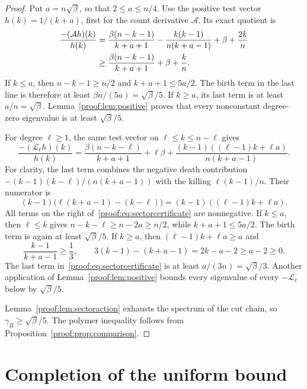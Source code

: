 \begin{proof}
Put $a=n\sqrt\beta$, so that $2\leq a\leq n/4$. Use the positive
test vector $h(k)=1/(k+a)$, first for the count derivative
$\mathcal A$. Its exact quotient is
\begin{align}
 \frac{-(\mathcal Ah)(k)}{h(k)}
 &=\frac{\beta(n-k-1)}{k+a+1}
   -\frac{k(k-1)}{n(k+a-1)}+\beta+\frac{2k}n\notag\\
 &\geq\frac{\beta(n-k-1)}{k+a+1}+\beta+\frac kn.
 \label{proof:eq:countreciprocal}
\end{align}
If $k\leq a$, then $n-k-1\geq n/2$ and
$k+a+1\leq5a/2$. The birth term in the last line is therefore at
least $\beta n/(5a)=\sqrt\beta/5$. If $k\geq a$, its last term is
at least $a/n=\sqrt\beta$. Lemma~\ref{proof:lem:positive} proves
that every nonconstant degree-zero eigenvalue is at least
$\sqrt\beta/5$.

For degree $\ell\geq1$, the same test vector on
$\ell\leq k\leq n-\ell$ gives
\begin{equation}\label{proof:eq:sectorcertificate}
 \frac{-(\mathcal L_\ell h)(k)}{h(k)}
 =\frac{\beta(n-k-\ell)}{k+a+1}+\ell\beta
  +\frac{(k-1)((\ell-1)k+\ell a)}{n(k+a-1)}.
\end{equation}
For clarity, the last term combines the negative death contribution
$-(k-1)(k-\ell)/(n(k+a-1))$ with the killing
$\ell(k-1)/n$. Their numerator is
\[
 (k-1)\bigl(\ell(k+a-1)-(k-\ell)\bigr)
 =(k-1)((\ell-1)k+\ell a).
\]
All terms on the right of~\eqref{proof:eq:sectorcertificate} are
nonnegative. If $k\leq a$, then $\ell\leq k$ gives
$n-k-\ell\geq n-2a\geq n/2$, while $k+a+1\leq5a/2$.
The birth term is again at least $\sqrt\beta/5$. If $k\geq a$,
then $(\ell-1)k+\ell a\geq a$ and
\[
 \frac{k-1}{k+a-1}\geq\frac13,
 \qquad
 3(k-1)-(k+a-1)=2k-a-2\geq a-2\geq0.
\]
The last term in~\eqref{proof:eq:sectorcertificate} is at least
$a/(3n)=\sqrt\beta/3$. Another application of
Lemma~\ref{proof:lem:positive} bounds every eigenvalue of every
$-\mathcal L_\ell$ below by $\sqrt\beta/5$.

Lemma~\ref{proof:lem:sectoraction} exhausts the spectrum of the cut
chain, so $\gamma_B\geq\sqrt\beta/5$. The polymer inequality follows
from Proposition~\ref{proof:prop:comparison}.
\end{proof}

\section{Completion of the uniform bound}
\label{proof:sec:completion}

